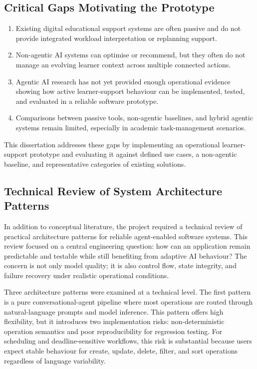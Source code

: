 \documentclass[12pt]{article}
\begin{document}
\subsection{Critical Gaps Motivating the Prototype}
\begin{enumerate}
    \item Existing digital educational support systems are often passive and do not provide integrated workload interpretation or replanning support.
    \item Non-agentic AI systems can optimise or recommend, but they often do not manage an evolving learner context across multiple connected actions.
    \item Agentic AI research has not yet provided enough operational evidence showing how active learner-support behaviour can be implemented, tested, and evaluated in a reliable software prototype.
    \item Comparisons between passive tools, non-agentic baselines, and hybrid agentic systems remain limited, especially in academic task-management scenarios.
\end{enumerate}
This dissertation addresses these gaps by implementing an operational learner-support prototype and evaluating it against defined use cases, a non-agentic baseline, and representative categories of existing solutions.

\subsection{Technical Review of System Architecture Patterns}
In addition to conceptual literature, the project required a technical review of practical architecture patterns for reliable agent-enabled software systems. This review focused on a central engineering question: how can an application remain predictable and testable while still benefiting from adaptive AI behaviour? The concern is not only model quality; it is also control flow, state integrity, and failure recovery under realistic operational conditions.

Three architecture patterns were examined at a technical level. The first pattern is a pure conversational-agent pipeline where most operations are routed through natural-language prompts and model inference. This pattern offers high flexibility, but it introduces two implementation risks: non-deterministic operation semantics and poor reproducibility for regression testing. For scheduling and deadline-sensitive workflows, this risk is substantial because users expect stable behaviour for create, update, delete, filter, and sort operations regardless of language variability.
\end{document}
